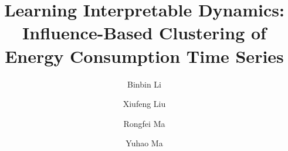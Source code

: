 \documentclass[final,authoryear,3p,times,review,sort&compress]{elsarticle}
\begin{document}
\begin{frontmatter}


\title{Learning Interpretable Dynamics: Influence-Based Clustering of Energy Consumption Time Series}

\author[ztie]{Binbin Li}

\author[dtu]{Xiufeng Liu}

\author[tzvcst]{Rongfei Ma}

\author[sydney]{Yuhao Ma}


\address[ztie]{Digital Campus Construction Center, Zhejiang Technical Institute of Economics, Hangzhou 310018 Zhejiang, China}

\address[dtu]{Department of Technology, Management and Economics, Technical University of Denmark, 2800 Kgs. Lyngby, Denmark}

\address[tzvcst]{School of Information Engineering, Taizhou Vocational College of Science \& Technology, Taizhou 318020 Zhejiang, China}

\address[sydney]{Business School, The University of Sydney, 2008 Sydney, New South Wales, Australia}







\end{frontmatter}
\end{document}
